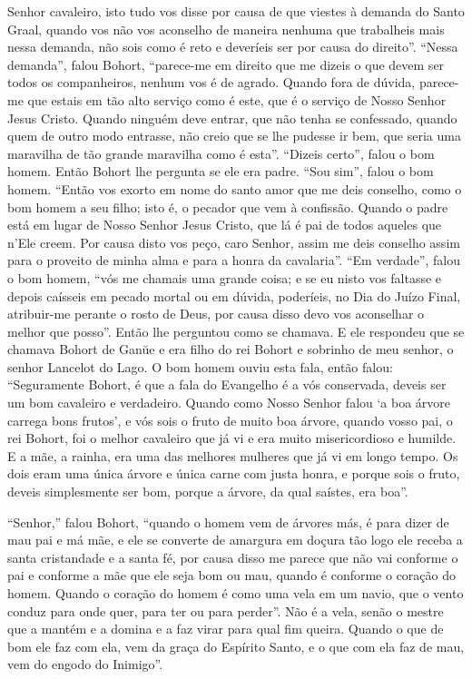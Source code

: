 Senhor cavaleiro, isto tudo vos disse por causa de que viestes à demanda do
Santo Graal, quando vos não vos aconselho de maneira nenhuma que trabalheis
mais nessa demanda, não sois como é reto e deveríeis ser por causa do direito”. 
“Nessa demanda”, falou Bohort, “parece-me em direito que me
dizeis o que devem ser todos os companheiros, nenhum vos é de agrado. Quando
fora de dúvida, parece-me que estais em tão alto serviço como é este, que é o
serviço de Nosso Senhor Jesus Cristo. Quando ninguém deve entrar, que não tenha
se confessado, quando quem de outro modo entrasse, não creio que se lhe pudesse
ir bem, que seria uma maravilha de tão grande maravilha como é esta”. “Dizeis
certo”, falou o bom homem. Então Bohort lhe pergunta se ele era padre. “Sou
sim”, falou o bom homem. “Então vos exorto  em nome do santo amor que me deis
conselho, como o bom homem a seu filho; isto é, o pecador que vem à confissão.
Quando o padre está em lugar de Nosso Senhor Jesus Cristo, que lá é pai de
todos aqueles que n’Ele creem. Por causa disto vos peço, caro Senhor, assim me
deis conselho assim para o proveito de minha alma e para a honra da cavalaria”. 
“Em verdade”, falou o bom homem, “vós me chamais uma grande coisa; e
se eu nisto vos faltasse e depois caísseis em pecado mortal ou em dúvida,
poderíeis, no Dia do Juízo Final, atribuir-me perante o rosto de Deus, por
causa disso devo vos aconselhar o melhor que posso”. Então lhe
perguntou como se chamava. E ele respondeu que se chamava Bohort de Gan\u{u}e e
era filho do rei Bohort e sobrinho de meu senhor,  o senhor Lancelot
do Lago. O bom homem ouviu esta fala,  então falou: “Seguramente Bohort, é que
a fala do Evangelho é a vós conservada, deveis ser um bom cavaleiro e
verdadeiro. Quando como Nosso Senhor falou ‘a boa árvore carrega bons frutos’,
e vós sois o fruto de muito boa árvore, quando vosso pai, o rei Bohort, foi o
melhor cavaleiro que já vi e era muito misericordioso e humilde. E a mãe, a
rainha, era uma das melhores mulheres que já vi em longo tempo. Os dois eram
uma única árvore e única carne com justa honra, e porque sois o fruto, deveis
simplesmente ser bom, porque a árvore, da qual saístes, era boa”. 

“Senhor,” falou Bohort, “quando o homem vem de árvores más, é para dizer de mau
pai e má mãe, e ele se converte de amargura em doçura tão logo ele receba a
santa cristandade e a santa fé, por causa disso me parece que não vai conforme
o pai e conforme a mãe que ele seja bom ou mau, quando é conforme o coração do
homem. Quando o coração do homem é como uma vela em um navio, que o vento
conduz para onde quer, para ter ou para perder”. Não é a vela, senão o mestre
que a mantém e a domina e a faz virar para qual fim queira. Quando o que de bom
ele faz com ela, vem da graça do Espírito Santo, e o que com ela faz de mau,
vem do engodo do Inimigo”. 

